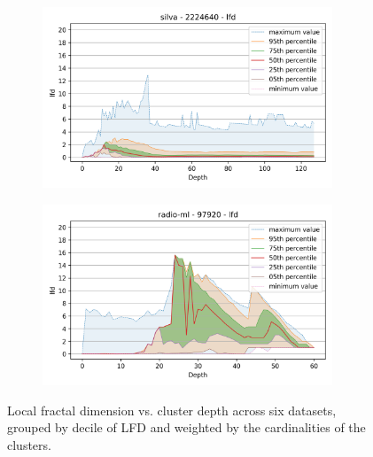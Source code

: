 \begin{figure}
\begin{subfigure}[b]{0.47\textwidth}
    \includegraphics[width=0.95\textwidth]{images/lfd_plots/silva-2224640-lfd.png}\\
    \label{fig:results:silva-lfd}
    \end{subfigure}%
    \begin{subfigure}[b]{0.47\textwidth}
    \includegraphics[width=0.95\textwidth]{images/lfd_plots/radio-ml-97920-lfd.png}\\
    \label{fig:results:radioml-lfd}
    \end{subfigure}%

    \caption{Local fractal dimension vs. cluster depth across six datasets, grouped by decile of LFD and weighted by the cardinalities of the clusters.}
    \label{fig:results:lfd-plots}
\end{figure}

